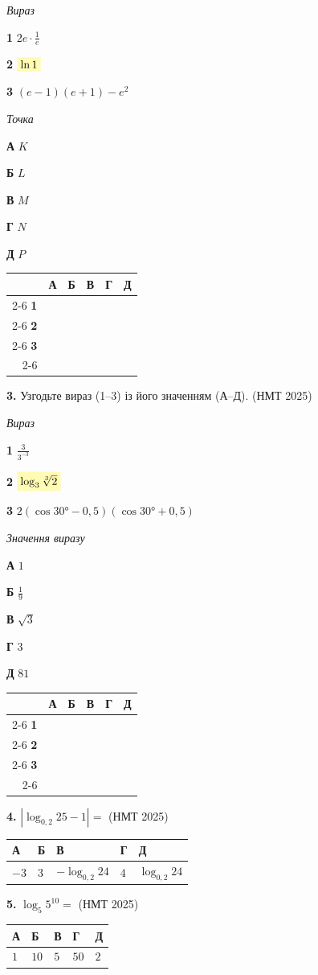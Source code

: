 \documentclass[14pt]{extarticle}
\newcommand{\answerGrid}{
    \begingroup
    \renewcommand{\arraystretch}{1.3} 
    \setlength{\tabcolsep}{7pt} 
    \begin{tabular}{r|c|c|c|c|c|}
         \multicolumn{1}{c}{} & \multicolumn{1}{c}{\textbf{А}} & \multicolumn{1}{c}{\textbf{Б}} & \multicolumn{1}{c}{\textbf{В}} & \multicolumn{1}{c}{\textbf{Г}} & \multicolumn{1}{c}{\textbf{Д}} \\ \cline{2-6}
         \textbf{1} & & & & & \\ \cline{2-6}
         \textbf{2} & & & & & \\ \cline{2-6}
         \textbf{3} & & & & & \\ \cline{2-6}
    \end{tabular}
    \endgroup
}
\newcommand{\matchingLayout}[3]{
    \noindent
    \begin{minipage}[t]{0.40\textwidth}
        #1
    \end{minipage}%
    \hfill
    \begin{minipage}[t]{0.28\textwidth}
        #2
    \end{minipage}%
    \hfill
    \begin{minipage}[t]{0.30\textwidth}
        \vspace{0pt}
        \begin{flushright}
        #3
        \end{flushright}
    \end{minipage}
}
\newcommand{\answerTable}[5]{
\begin{center}
\begin{tabular}{|*{5}{>{\centering\arraybackslash}m{2.8cm}|}}
\hline
\rule[-0.3cm]{0pt}{0.8cm}\textbf{А} & \textbf{Б} & \textbf{В} & \textbf{Г} & \textbf{Д} \\
\hline
\rule[-0.4cm]{0pt}{1.0cm}#1 & \rule[-0.4cm]{0pt}{1.0cm}#2 & \rule[-0.4cm]{0pt}{1.0cm}#3 & \rule[-0.4cm]{0pt}{1.0cm}#4 & \rule[-0.4cm]{0pt}{1.0cm}#5 \\
\hline
\end{tabular}
\end{center}
}
\newcommand{\nmtyear}[1]{\hfill{\small\color{yearcolor}(НМТ #1)}}
\begin{document}
\vspace{0.3cm}

\matchingLayout{\textit{Вираз}

\textbf{1} \quad $2e \cdot \displaystyle\frac{1}{e}$

\textbf{2} \quad $\colorbox{yellow!30}{$\ln 1$}$

\textbf{3} \quad $(e - 1)(e + 1) - e^2$
}{
\textit{Точка}

\textbf{А} \quad $K$

\textbf{Б} \quad $L$

\textbf{В} \quad $M$

\textbf{Г} \quad $N$

\textbf{Д} \quad $P$
}{
\answerGrid
}

\vspace{0.8cm}

\noindent\textbf{3.} Узгодьте вираз (1--3) із його значенням (А--Д). \nmtyear{2025}
\vspace{0.3cm}

\matchingLayout{\textit{Вираз}

\textbf{1} \quad $\displaystyle\frac{3}{3^{-3}}$

\textbf{2} \quad $\colorbox{yellow!30}{$\log_3 \sqrt[3]{2}$}$

\textbf{3} \quad $2(\cos 30° - 0{,}5)(\cos 30° + 0{,}5)$
}{
\textit{Значення виразу}

\textbf{А} \quad $1$

\textbf{Б} \quad $\displaystyle\frac{1}{9}$

\textbf{В} \quad $\sqrt{3}$

\textbf{Г} \quad $3$

\textbf{Д} \quad $81$
}{
\answerGrid
}

\vspace{0.8cm}

\noindent\textbf{4.} $|\log_{0,2} 25 - 1| = $ \nmtyear{2025}
\vspace{0.3cm}

\answerTable{$-3$}{$3$}{$-\log_{0,2} 24$}{$4$}{$\log_{0,2} 24$}

\vspace{0.5cm}

\noindent\textbf{5.} $\log_5 5^{10} = $ \nmtyear{2025}
\vspace{0.3cm}

\answerTable{$1$}{$10$}{$5$}{$50$}{$2$}

\vspace{0.5cm}
\end{document}
